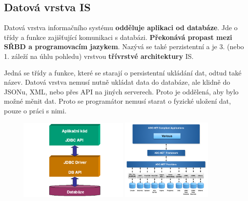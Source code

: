 \subsection{Datová vrstva IS}
Datová vrstva informačního systému \textbf{odděluje aplikaci od databáze}. Jde o třídy a funkce zajišťující komunikaci s databázi. \textbf{Překonává propast mezi SŘBD a programovacím jazykem}. Nazývá se také perzistentní a je 3. (nebo 1. záleží na úhlu pohledu) vrstvou \textbf{třívrstvé architektury} IS.

Jedná se třídy a funkce, které se starají o persistentní ukládání dat, odtud také název. Datová vrstva nemusí nutně ukládat data do databáze, ale klidně do JSONu, XML, nebo přes API na jiných serverech. Proto je oddělená, aby bylo možné měnit  dat. Proto se programátor nemusí starat o fyzické uložení dat, pouze o práci s nimi.

\begin{figure}[H]
	\centering
	\includegraphics[width=0.48\textwidth]{assets/jdbc.png}
	\includegraphics[width=0.4\textwidth]{assets/adonet.png}
\end{figure}

